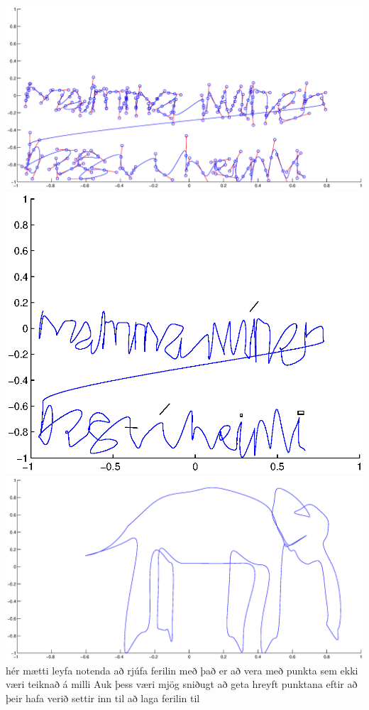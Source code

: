 \documentclass[a4]{article}
\begin{document}
\includegraphics[width=\textwidth]{mamma1.eps}\\
\includegraphics[height=0.495\textheight]{mamma2.eps}\\
\includegraphics[width=\textwidth]{fill.eps}
hér mætti leyfa notenda að rjúfa ferilin með það er að vera með punkta sem ekki væri teiknað á milli 
Auk þess væri mjög sniðugt að geta hreyft punktana eftir að þeir hafa verið settir inn til að laga ferilin til
\end{document}

